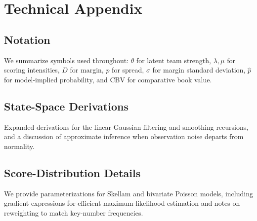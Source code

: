 \documentclass[12pt]{report}  %
\numberwithin{equation}{section}
\theoremstyle{plain}
\theoremstyle{definition}
\theoremstyle{remark}
\begin{document}












\appendix
\makeatletter
\renewcommand\thechapter{\AlphAlph{\value{chapter}}}
\makeatother
\chapter{Technical Appendix}
\section{Notation}
We summarize symbols used throughout: $\theta$ for latent team strength, $\lambda,\mu$ for scoring intensities, $D$ for margin, $p$ for spread, $\sigma$ for margin standard deviation, $\hat p$ for model-implied probability, and CBV for comparative book value.

\section{State-Space Derivations}
Expanded derivations for the linear-Gaussian filtering and smoothing recursions, and a discussion of approximate inference when observation noise departs from normality.

\section{Score-Distribution Details}
We provide parameterizations for Skellam and bivariate Poisson models, including gradient expressions for efficient maximum-likelihood estimation and notes on reweighting to match key-number frequencies.
\end{document}

